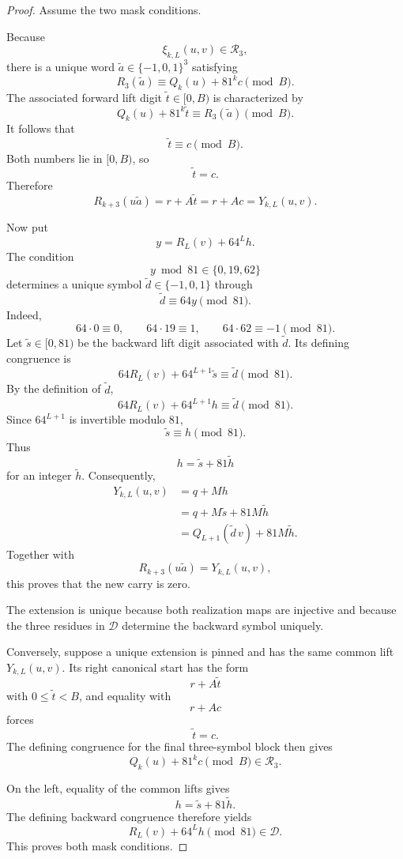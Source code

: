 \documentclass[11pt]{article}
\theoremstyle{remark}
\newcommand{\E}{\{-1,0,1\}}
\newcommand{\Rset}{\mathcal{R}}
\newcommand{\Dset}{\mathcal{D}}
\begin{document}
\begin{proof}
Assume the two mask conditions.

Because
\[
\xi_{k,L}(u,v)\in\Rset_3,
\]
there is a unique word \(\widetilde a\in\E^3\) satisfying
\[
R_3(\widetilde a)
\equiv
Q_k(u)+81^kc
\pmod B.
\]
The associated forward lift digit \(\widetilde t\in[0,B)\) is characterized by
\[
Q_k(u)+81^k\widetilde t
\equiv
R_3(\widetilde a)
\pmod B.
\]
It follows that
\[
\widetilde t\equiv c\pmod B.
\]
Both numbers lie in \([0,B)\), so
\[
\widetilde t=c.
\]
Therefore
\[
R_{k+3}(u\widetilde a)
=
r+A\widetilde t
=
r+Ac
=
Y_{k,L}(u,v).
\]

Now put
\[
y=
R_L(v)+64^Lh.
\]
The condition
\[
y\bmod81\in\{0,19,62\}
\]
determines a unique symbol \(\widetilde d\in\E\) through
\[
\widetilde d\equiv64y\pmod{81}.
\]
Indeed,
\[
64\cdot0\equiv0,\qquad
64\cdot19\equiv1,\qquad
64\cdot62\equiv-1
\pmod{81}.
\]
Let \(\widetilde s\in[0,81)\) be the backward lift digit associated with \(\widetilde d\).  Its defining congruence is
\[
64R_L(v)+64^{L+1}\widetilde s
\equiv
\widetilde d
\pmod{81}.
\]
By the definition of \(\widetilde d\),
\[
64R_L(v)+64^{L+1}h
\equiv
\widetilde d
\pmod{81}.
\]
Since \(64^{L+1}\) is invertible modulo \(81\),
\[
\widetilde s\equiv h\pmod{81}.
\]
Thus
\[
h=\widetilde s+81\widetilde h
\]
for an integer \(\widetilde h\).  Consequently,
\begin{align*}
Y_{k,L}(u,v)
&=q+Mh\\
&=q+M\widetilde s+81M\widetilde h\\
&=Q_{L+1}(\widetilde d\,v)+81M\widetilde h.
\end{align*}
Together with
\[
R_{k+3}(u\widetilde a)=Y_{k,L}(u,v),
\]
this proves that the new carry is zero.

The extension is unique because both realization maps are injective and because the three residues in \(\Dset\) determine the backward symbol uniquely.

Conversely, suppose a unique extension is pinned and has the same common lift \(Y_{k,L}(u,v)\).  Its right canonical start has the form
\[
r+A\widetilde t
\]
with \(0\le\widetilde t<B\), and equality with
\[
r+Ac
\]
forces
\[
\widetilde t=c.
\]
The defining congruence for the final three-symbol block then gives
\[
Q_k(u)+81^kc\pmod B\in\Rset_3.
\]

On the left, equality of the common lifts gives
\[
h=\widetilde s+81\widetilde h.
\]
The defining backward congruence therefore yields
\[
R_L(v)+64^Lh\pmod{81}\in\Dset.
\]
This proves both mask conditions.
\end{proof}
\end{document}

